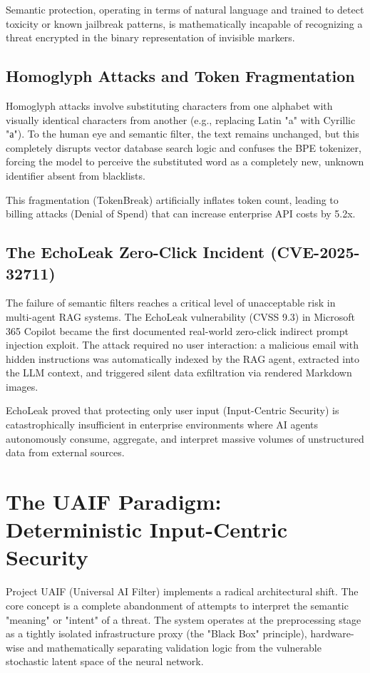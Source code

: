 \documentclass[10pt,a4paper]{article}
\begin{document}
Semantic protection, operating in terms of natural language and trained to detect toxicity or known jailbreak patterns, is mathematically incapable of recognizing a threat encrypted in the binary representation of invisible markers.

\subsection{Homoglyph Attacks and Token Fragmentation}
Homoglyph attacks involve substituting characters from one alphabet with visually identical characters from another (e.g., replacing Latin "a" with Cyrillic "\foreignlanguage{russian}{а}"). To the human eye and semantic filter, the text remains unchanged, but this completely disrupts vector database search logic and confuses the BPE tokenizer, forcing the model to perceive the substituted word as a completely new, unknown identifier absent from blacklists.

This fragmentation (TokenBreak) artificially inflates token count, leading to billing attacks (Denial of Spend) that can increase enterprise API costs by 5.2x.

\subsection{The EchoLeak Zero-Click Incident (CVE-2025-32711)}
The failure of semantic filters reaches a critical level of unacceptable risk in multi-agent RAG systems. The EchoLeak vulnerability (CVSS 9.3) in Microsoft 365 Copilot became the first documented real-world zero-click indirect prompt injection exploit. The attack required no user interaction: a malicious email with hidden instructions was automatically indexed by the RAG agent, extracted into the LLM context, and triggered silent data exfiltration via rendered Markdown images.

EchoLeak proved that protecting only user input (Input-Centric Security) is catastrophically insufficient in enterprise environments where AI agents autonomously consume, aggregate, and interpret massive volumes of unstructured data from external sources.

\section{The UAIF Paradigm: Deterministic Input-Centric Security}
Project UAIF (Universal AI Filter) implements a radical architectural shift. The core concept is a complete abandonment of attempts to interpret the semantic "meaning" or "intent" of a threat. The system operates at the preprocessing stage as a tightly isolated infrastructure proxy (the "Black Box" principle), hardware-wise and mathematically separating validation logic from the vulnerable stochastic latent space of the neural network.
\end{document}
